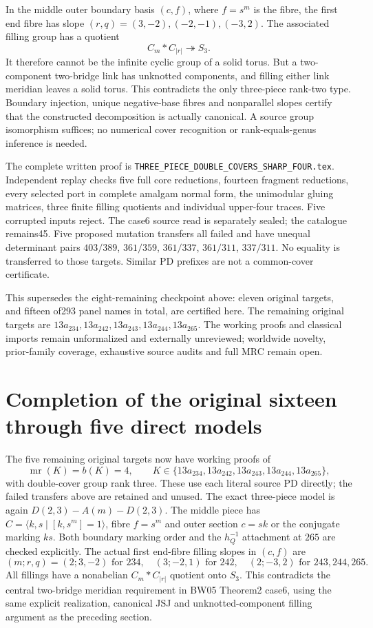 \documentclass[11pt]{article}
\newcommand{\mr}{\operatorname{mr}}
\begin{document}
In the middle outer boundary basis $(c,f)$, where $f=s^m$ is the fibre,
the first end fibre has slope $(r,q)=(3,-2),(-2,-1),(-3,2)$.
The associated filling group has a quotient
\[
 C_m*C_{|r|}\twoheadrightarrow S_3.
\]
It therefore cannot be the infinite cyclic group of a solid torus.
But a two-component two-bridge link has unknotted components, and filling
either link meridian leaves a solid torus. This contradicts the only
three-piece rank-two type. Boundary injection, unique negative-base
fibres and nonparallel slopes certify that the constructed decomposition
is actually canonical. A source group isomorphism suffices; no numerical
cover recognition or rank-equals-genus inference is needed.

The complete written proof is
\texttt{THREE\_PIECE\_DOUBLE\_COVERS\_SHARP\_FOUR.tex}.
Independent replay checks five full core reductions, fourteen fragment
reductions, every selected port in complete amalgam normal form, the
unimodular gluing matrices, three finite filling quotients and individual
upper-four traces. Five corrupted inputs reject. The case6 source read
is separately sealed; the catalogue remains45.
Five proposed mutation transfers all failed and have unequal determinant
pairs $403/389$, $361/359$, $361/337$, $361/311$, $337/311$.
No equality is transferred to those targets. Similar PD prefixes are
not a common-cover certificate.

This supersedes the eight-remaining checkpoint above: eleven original
targets, and fifteen of293 panel names in total, are certified here.
The remaining original targets are
$13a_{234},13a_{242},13a_{243},13a_{244},13a_{265}$.
The working proofs and classical imports remain unformalized and externally
unreviewed; worldwide novelty, prior-family coverage, exhaustive source
audits and full MRC remain open.

\section{Completion of the original sixteen through five direct models}

The five remaining original targets now have working proofs of
\[
 \mr(K)=b(K)=4,\qquad
 K\in\{13a_{234},13a_{242},13a_{243},13a_{244},13a_{265}\},
\]
with double-cover group rank three. These use each literal source PD
directly; the failed transfers above are retained and unused.
The exact three-piece model is again $D(2,3)-A(m)-D(2,3)$.
The middle piece has $C=\langle k,s\mid[k,s^m]=1\rangle$, fibre
$f=s^m$ and outer section $c=sk$ or the conjugate marking $ks$.
Both boundary marking order and the $h_Q^{-1}$ attachment at $265$
are checked explicitly. The actual first end-fibre filling slopes in
$(c,f)$ are
\[
 (m;r,q)=(2;3,-2)\text{ for }234,\quad
 (3;-2,1)\text{ for }242,\quad
 (2;-3,2)\text{ for }243,244,265.
\]
All fillings have a nonabelian $C_m*C_{|r|}$ quotient onto $S_3$.
This contradicts the central two-bridge meridian requirement in BW05
Theorem2 case6, using the same explicit realization, canonical JSJ and
unknotted-component filling argument as the preceding section.
\end{document}
